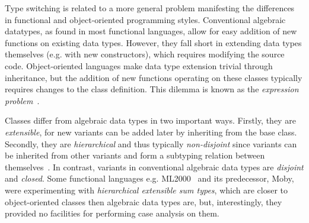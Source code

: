 Type switching is related to a more general problem manifesting the differences 
in functional and object-oriented programming styles.
Conventional algebraic datatypes, as found in most functional languages, allow 
for easy addition of new functions on existing data types. However, they fall short 
in extending data types themselves (e.g. with new constructors), which requires 
modifying the source code. Object-oriented languages make 
data type extension trivial through inheritance, but the addition of new 
functions operating on these classes typically requires changes to the class 
definition. This dilemma is known as the \emph{expression problem}~\cite{Cook90,exprproblem}.

\noindent
Classes differ from algebraic data types in two important ways. Firstly, they
are \emph{extensible}, for new variants can be added later by inheriting from
the base class. Secondly, they are \emph{hierarchical} and thus typically 
\emph{non-disjoint} since variants can be inherited from other variants and form 
a subtyping relation between themselves~\cite{Glew99}. In contrast, variants in 
conventional algebraic data types are \emph{disjoint} and \emph{closed}.
Some functional languages e.g. ML2000~\cite{ML2000} and its predecessor, Moby, 
were experimenting with \emph{hierarchical extensible sum types}, which are 
closer to object-oriented classes then algebraic data types are, but, 
interestingly, they provided no %
facilities for performing case analysis on them.

